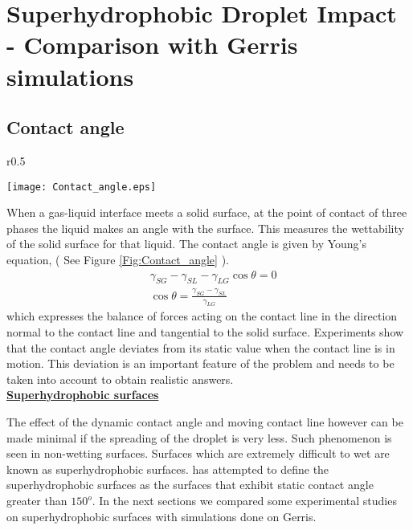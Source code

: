 
\chapter{Superhydrophobic Droplet Impact - Comparison with Gerris simulations}

\section{Contact angle}
\begin{wrapfigure}{r}{0.5\textwidth}
  \begin{center}
    \texttt{[image: Contact\_angle.eps]}
  \end{center}
  \caption{Contact Angle}
  \label{Fig:Contact_angle}
\end{wrapfigure}
When a gas-liquid interface meets a solid surface, at the point of contact of three phases the liquid makes an angle with the surface. This measures the wettability of 
the solid surface for that liquid. The contact angle is given by Young's equation, ( See Figure \ref{Fig:Contact_angle} ). 
\begin{equation}
 \boxed{ \begin{align}
 &\gamma_{SG} -\gamma_{SL} - \gamma_{LG} \cos \theta =0  \\
 &\cos \theta =\frac{\gamma_{SG} -\gamma_{SL}}{\gamma_{LG}} 
 \end{align}
 }
 \label{Eq:youngs}
\end{equation}
which expresses the balance of forces acting on the contact line in the direction normal to the contact line and tangential
to the solid surface. Experiments show that the contact angle deviates from its static value when
the contact line is in motion. This deviation is an important feature of the problem and needs to be taken into account to obtain realistic answers.\\
\underline{\textbf{Superhydrophobic surfaces}}\par
The effect of the dynamic contact angle and moving contact line however can be made minimal if the spreading of the droplet is very less. Such phenomenon is seen in non-wetting surfaces. 
Surfaces which are extremely difficult to wet are known as superhydrophobic surfaces. \cite{wang2007definition} has attempted to define the superhydrophobic surfaces as the
surfaces that exhibit static contact angle greater than $150^o$. In the next sections we compared some experimental studies on superhydrophobic surfaces with simulations done on Gerris.


